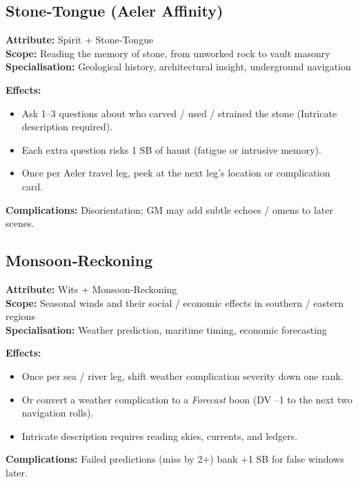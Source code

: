\subsection{Stone‑Tongue (Aeler Affinity)}\label{subsec:stone_tongue}

\textbf{Attribute:} Spirit + Stone‑Tongue\\
\textbf{Scope:} Reading the memory of stone, from unworked rock to vault masonry\\
\textbf{Specialisation:} Geological history, architectural insight, underground navigation

\textbf{Effects:}
\begin{itemize}
    \item Ask 1--3 questions about who carved / used / strained the stone (Intricate description required).
    \item Each extra question risks 1 SB of haunt (fatigue or intrusive memory).
    \item Once per Aeler travel leg, peek at the next leg's location or complication card.
\end{itemize}
\textbf{Complications:} Disorientation; GM may add subtle echoes / omens to later scenes.

\subsection{Monsoon‑Reckoning}\label{subsec:monsoon_reckoning}

\textbf{Attribute:} Wits + Monsoon‑Reckoning\\
\textbf{Scope:} Seasonal winds and their social / economic effects in southern / eastern regions\\
\textbf{Specialisation:} Weather prediction, maritime timing, economic forecasting

\textbf{Effects:}
\begin{itemize}
    \item Once per sea / river leg, shift weather complication severity down one rank.
    \item Or convert a weather complication to a \emph{Forecast} boon (DV --1 to the next two navigation rolls).
    \item Intricate description requires reading skies, currents, and ledgers.
\end{itemize}
\textbf{Complications:} Failed predictions (miss by 2+) bank +1 SB for false windows later.

